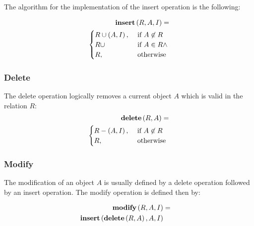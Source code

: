 The algorithm for the implementation of the insert operation is the following:

\begin{align}
\label{eq:insert}
\mbox{\textbf{insert}} \left(R ,A, I\right) =\\
\begin{cases}
\nonumber
R \cup \left(A, I \right), & \mbox{ if }  A \not \in R\\
R \cup  & \mbox{ if }  A \in R \wedge \\
R, & \mbox{ otherwise }  
\end{cases} 	
\end{align}

\subsubsection{Delete}
The delete operation logically removes a current object $A$ which is valid in the relation $R$:
\begin{align}
\label{eq:delete}
\mbox{\textbf{delete}} \left(R ,A \right) =\\
\begin{cases}
\nonumber
R - \left(A, I \right), & \mbox{ if }  A \not \in R\\
R, & \mbox{ otherwise }  
\end{cases} 	
\end{align}


\subsubsection{Modify}
The modification of an object $A$ is usually defined by a delete operation followed by an insert operation. The modify operation is defined then by:

\begin{align}
\label{eq:modify}
\mbox{\textbf{modify}} \left( R, A, I \right) &=&\\
\nonumber
\mbox{\textbf{insert}} \left( \mbox{\textbf{delete}} \left(R, A \right), A, I \right)
\end{align}